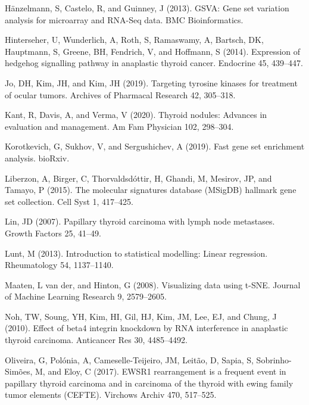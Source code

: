 \documentclass[
  parskip,
  oneside]{scrreprt}
\newlength{\cslhangindent}
\newlength{\cslentryspacingunit} %
\newenvironment{CSLReferences}[2] %
 {%
  \setlength{\parindent}{0pt}
  \ifodd #1
  \let\oldpar\par
  \def\par{\hangindent=\cslhangindent\oldpar}
  \fi
  \setlength{\parskip}{#2\cslentryspacingunit}
 }%
 {}
\begin{document}
\begin{CSLReferences}{0}{0}
\leavevmode{}%
Hänzelmann, S, Castelo, R, and Guinney, J (2013). {GSVA}: Gene set
variation analysis for microarray and {RNA-Seq} data. BMC
Bioinformatics.

\leavevmode{}%
Hinterseher, U, Wunderlich, A, Roth, S, Ramaswamy, A, Bartsch, DK,
Hauptmann, S, Greene, BH, Fendrich, V, and Hoffmann, S (2014).
Expression of hedgehog signalling pathway in anaplastic thyroid cancer.
Endocrine 45, 439--447.

\leavevmode{}%
Jo, DH, Kim, JH, and Kim, JH (2019). Targeting tyrosine kinases for
treatment of ocular tumors. Archives of Pharmacal Research 42, 305--318.

\leavevmode{}%
Kant, R, Davis, A, and Verma, V (2020). Thyroid nodules: Advances in
evaluation and management. Am Fam Physician 102, 298--304.

\leavevmode{}%
Korotkevich, G, Sukhov, V, and Sergushichev, A (2019). Fast gene set
enrichment analysis. bioRxiv.

\leavevmode{}%
Liberzon, A, Birger, C, Thorvaldsdóttir, H, Ghandi, M, Mesirov, JP, and
Tamayo, P (2015). The molecular signatures database (MSigDB) hallmark
gene set collection. Cell Syst 1, 417--425.

\leavevmode{}%
Lin, JD (2007). Papillary thyroid carcinoma with lymph node metastases.
Growth Factors 25, 41--49.

\leavevmode{}%
Lunt, M (2013). Introduction to statistical modelling: Linear
regression. Rheumatology 54, 1137--1140.

\leavevmode{}%
Maaten, L van der, and Hinton, G (2008). Visualizing data using t-SNE.
Journal of Machine Learning Research 9, 2579--2605.

\leavevmode{}%
Noh, TW, Soung, YH, Kim, HI, Gil, HJ, Kim, JM, Lee, EJ, and Chung, J
(2010). Effect of {beta}4 integrin knockdown by RNA interference in
anaplastic thyroid carcinoma. Anticancer Res 30, 4485--4492.

\leavevmode{}%
Oliveira, G, Polónia, A, Cameselle-Teijeiro, JM, Leitão, D, Sapia, S,
Sobrinho-Simões, M, and Eloy, C (2017). EWSR1 rearrangement is a
frequent event in papillary thyroid carcinoma and in carcinoma of the
thyroid with ewing family tumor elements (CEFTE). Virchows Archiv 470,
517--525.


\end{CSLReferences}
\end{document}
